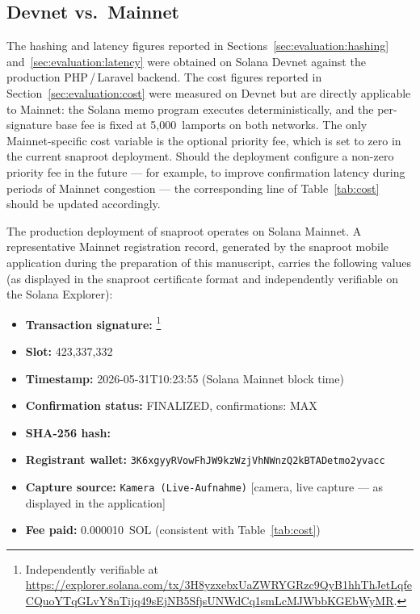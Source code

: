 \documentclass[11pt,a4paper]{article}
\begin{document}
\subsection{Devnet vs.\ Mainnet}
\label{sec:evaluation:devnet-vs-mainnet}

The hashing and latency figures reported in
Sections~\ref{sec:evaluation:hashing}
and~\ref{sec:evaluation:latency} were obtained on Solana Devnet
against the production PHP\,/\,Laravel backend. The cost figures
reported in Section~\ref{sec:evaluation:cost} were measured on Devnet
but are directly applicable to Mainnet: the Solana memo program
executes deterministically, and the per-signature base fee is fixed at
5{,}000~lamports on both networks. The only Mainnet-specific cost
variable is the optional priority fee, which is set to zero in the
current snaproot deployment. Should the deployment configure a
non-zero priority fee in the future --- for example, to improve
confirmation latency during periods of Mainnet congestion --- the
corresponding line of Table~\ref{tab:cost} should be updated
accordingly.

The production deployment of snaproot operates on Solana Mainnet. A
representative Mainnet registration record, generated by the snaproot
mobile application during the preparation of this manuscript, carries
the following values (as displayed in the snaproot certificate format
and independently verifiable on the Solana Explorer):

\begin{itemize}
\item \textbf{Transaction signature:}
  \texttt{}%
  \footnote{Independently verifiable at
  \url{https://explorer.solana.com/tx/3H8yzxebxUaZWRYGRzc9QyB1hhThJetLqfeCQuoYTqGLvY8nTijq49sEjNB5SfjsUNWdCq1smLcMJWbbKGEbWyMR}.}
\item \textbf{Slot:} 423{,}337{,}332
\item \textbf{Timestamp:} 2026-05-31T10:23:55 (Solana Mainnet block time)
\item \textbf{Confirmation status:} FINALIZED, confirmations: MAX
\item \textbf{SHA-256 hash:}
  \texttt{}
\item \textbf{Registrant wallet:}
  \texttt{3K6xgyyRVowFhJW9kzWzjVhNWnzQ2kBTADetmo2yvacc}
\item \textbf{Capture source:} \texttt{Kamera (Live-Aufnahme)}
  [camera, live capture --- as displayed in the application]
\item \textbf{Fee paid:} 0.000010~SOL (consistent with
  Table~\ref{tab:cost})
\end{itemize}
\end{document}
